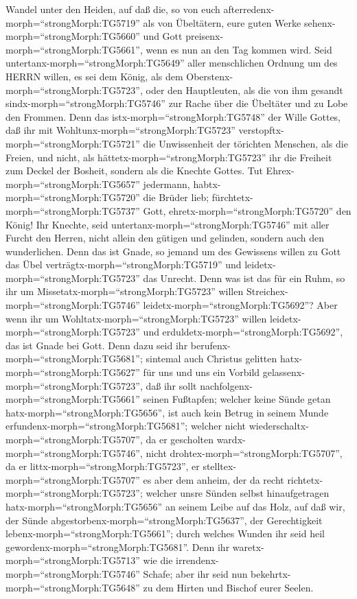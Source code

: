 Wandel unter den Heiden, auf daß die, so von euch
afterredenx-morph=``strongMorph:TG5719'' als von Übeltätern, eure guten
Werke sehenx-morph=``strongMorph:TG5660'' und Gott
preisenx-morph=``strongMorph:TG5661'', wenn es nun an den Tag kommen
wird.  Seid untertanx-morph=``strongMorph:TG5649'' aller
menschlichen Ordnung um des HERRN willen, es sei dem König, als dem
Oberstenx-morph=``strongMorph:TG5723'',  oder den
Hauptleuten, als die von ihm gesandt sindx-morph=``strongMorph:TG5746''
zur Rache über die Übeltäter und zu Lobe den Frommen.  Denn
das istx-morph=``strongMorph:TG5748'' der Wille Gottes, daß ihr mit
Wohltunx-morph=``strongMorph:TG5723''
verstopftx-morph=``strongMorph:TG5721'' die Unwissenheit der törichten
Menschen,  als die Freien, und nicht, als
hättetx-morph=``strongMorph:TG5723'' ihr die Freiheit zum Deckel der
Bosheit, sondern als die Knechte Gottes.  Tut
Ehrex-morph=``strongMorph:TG5657'' jedermann,
habtx-morph=``strongMorph:TG5720'' die Brüder lieb;
fürchtetx-morph=``strongMorph:TG5737'' Gott,
ehretx-morph=``strongMorph:TG5720'' den König!  Ihr
Knechte, seid untertanx-morph=``strongMorph:TG5746'' mit aller Furcht
den Herren, nicht allein den gütigen und gelinden, sondern auch den
wunderlichen.  Denn das ist Gnade, so jemand um des
Gewissens willen zu Gott das Übel verträgtx-morph=``strongMorph:TG5719''
und leidetx-morph=``strongMorph:TG5723'' das Unrecht.  Denn
was ist das für ein Ruhm, so ihr um
Missetatx-morph=``strongMorph:TG5723'' willen
Streichex-morph=``strongMorph:TG5746''
leidetx-morph=``strongMorph:TG5692''? Aber wenn ihr um
Wohltatx-morph=``strongMorph:TG5723'' willen
leidetx-morph=``strongMorph:TG5723'' und
erduldetx-morph=``strongMorph:TG5692'', das ist Gnade bei Gott.
 Denn dazu seid ihr berufenx-morph=``strongMorph:TG5681'';
sintemal auch Christus gelitten hatx-morph=``strongMorph:TG5627'' für
uns und uns ein Vorbild gelassenx-morph=``strongMorph:TG5723'', daß ihr
sollt nachfolgenx-morph=``strongMorph:TG5661'' seinen Fußtapfen;
 welcher keine Sünde getan
hatx-morph=``strongMorph:TG5656'', ist auch kein Betrug in seinem Munde
erfundenx-morph=``strongMorph:TG5681'';  welcher nicht
wiederschaltx-morph=``strongMorph:TG5707'', da er gescholten
wardx-morph=``strongMorph:TG5746'', nicht
drohtex-morph=``strongMorph:TG5707'', da er
littx-morph=``strongMorph:TG5723'', er
stelltex-morph=``strongMorph:TG5707'' es aber dem anheim, der da recht
richtetx-morph=``strongMorph:TG5723'';  welcher unsre
Sünden selbst hinaufgetragen hatx-morph=``strongMorph:TG5656'' an seinem
Leibe auf das Holz, auf daß wir, der Sünde
abgestorbenx-morph=``strongMorph:TG5637'', der Gerechtigkeit
lebenx-morph=``strongMorph:TG5661''; durch welches Wunden ihr seid heil
gewordenx-morph=``strongMorph:TG5681''.  Denn ihr
waretx-morph=``strongMorph:TG5713'' wie die
irrendenx-morph=``strongMorph:TG5746'' Schafe; aber ihr seid nun
bekehrtx-morph=``strongMorph:TG5648'' zu dem Hirten und Bischof eurer
Seelen.

